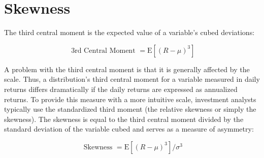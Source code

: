 \documentclass[11pt]{article}
\begin{document}
\section*{Skewness}
The third central moment is the expected value of a variable's cubed deviations:


\begin{equation*}
\text { 3rd Central Moment }=\mathrm{E}\left[(R-\mu)^{3}\right] \tag{10}
\end{equation*}


A problem with the third central moment is that it is generally affected by the scale. Thus, a distribution's third central moment for a variable measured in daily returns differs dramatically if the daily returns are expressed as annualized returns. To provide this measure with a more intuitive scale, investment analysts typically use the standardized third moment (the relative skewness or simply the skewness). The skewness is equal to the third central moment divided by the standard deviation of the variable cubed and serves as a measure of asymmetry:


\begin{equation*}
\text { Skewness }=\mathrm{E}\left[(R-\mu)^{3}\right] / \sigma^{3} \tag{11}
\end{equation*}
\end{document}
